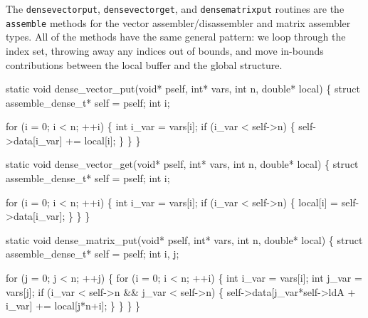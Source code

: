 The {\tt{}dense{}vector{}put}, {\tt{}dense{}vector{}get}, and {\tt{}dense{}matrix{}put}
routines are the {\tt{}assemble} methods for the vector assembler/disassembler
and matrix assembler types.  All of the methods have the same general
pattern: we loop through the index set, throwing away any indices out of
bounds, and move in-bounds contributions between the local buffer and the 
global structure.

\nwenddocs{}\endmoddef
static void dense_vector_put(void* pself, int* vars, int n, double* local)
\{
    struct assemble_dense_t* self = pself;
    int i;

    for (i = 0; i < n; ++i) \{
        int i_var = vars[i];
        if (i_var < self->n) \{
            self->data[i_var] += local[i];
        \}
    \}
\}

\nwendcode{}\nwdocspar

\nwenddocs{}\plusendmoddef
static void dense_vector_get(void* pself, int* vars, int n,
                                     double* local)
\{
    struct assemble_dense_t* self = pself;
    int i;

    for (i = 0; i < n; ++i) \{
        int i_var = vars[i];
        if (i_var < self->n) \{
            local[i] = self->data[i_var];
        \}
    \}
\}

\nwendcode{}\nwdocspar

\nwenddocs{}\plusendmoddef
static void dense_matrix_put(void* pself, int* vars, int n, double* local)
\{
    struct assemble_dense_t* self = pself;
    int i, j;

    for (j = 0; j < n; ++j) \{
        for (i = 0; i < n; ++i) \{
            int i_var = vars[i];
            int j_var = vars[j];
            if (i_var < self->n && j_var < self->n) \{
                self->data[j_var*self->ldA + i_var] += local[j*n+i];
            \}
        \}
    \}
\}

